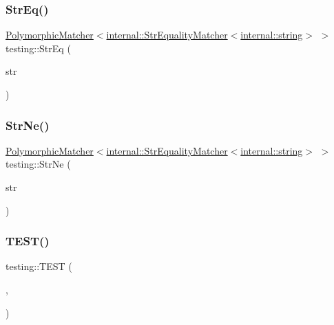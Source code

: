 \subsubsection{\texorpdfstring{Str\+Eq()}{StrEq()}}
{\footnotesize\ttfamily \hyperlink{classtesting_1_1_polymorphic_matcher}{Polymorphic\+Matcher}$<$\hyperlink{classtesting_1_1internal_1_1_str_equality_matcher}{internal\+::\+Str\+Equality\+Matcher}$<$\hyperlink{namespacetesting_1_1internal_a8e8ff5b11e64078831112677156cb111}{internal\+::string}$>$ $>$ testing\+::\+Str\+Eq (\begin{DoxyParamCaption}\item[{const \hyperlink{namespacetesting_1_1internal_a8e8ff5b11e64078831112677156cb111}{internal\+::string} \&}]{str }\end{DoxyParamCaption})\hspace{0.3cm}{\ttfamily [inline]}}

\mbox{\label{namespacetesting_a6f6b8af3d19cb969df0eb995c47a14d2}} 
\subsubsection{\texorpdfstring{Str\+Ne()}{StrNe()}}
{\footnotesize\ttfamily \hyperlink{classtesting_1_1_polymorphic_matcher}{Polymorphic\+Matcher}$<$\hyperlink{classtesting_1_1internal_1_1_str_equality_matcher}{internal\+::\+Str\+Equality\+Matcher}$<$\hyperlink{namespacetesting_1_1internal_a8e8ff5b11e64078831112677156cb111}{internal\+::string}$>$ $>$ testing\+::\+Str\+Ne (\begin{DoxyParamCaption}\item[{const \hyperlink{namespacetesting_1_1internal_a8e8ff5b11e64078831112677156cb111}{internal\+::string} \&}]{str }\end{DoxyParamCaption})\hspace{0.3cm}{\ttfamily [inline]}}

\mbox{\label{namespacetesting_af4187d1b48a2812f1335721ed8f30a99}} 
\subsubsection{\texorpdfstring{T\+E\+S\+T()}{TEST()}\hspace{0.1cm}{\footnotesize\ttfamily [1/7]}}
{\footnotesize\ttfamily testing\+::\+T\+E\+ST (\begin{DoxyParamCaption}\item[{G\+Test\+Env\+Var\+Test}]{,  }\item[{Dummy}]{ }\end{DoxyParamCaption})}

